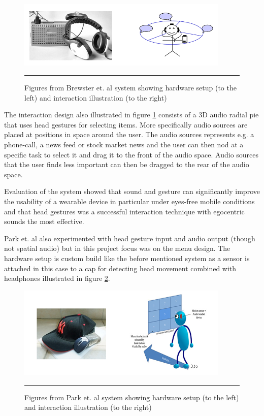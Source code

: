\begin{figure}[t]
	\centering
		\includegraphics[width=0.9\textwidth,height=\textheight,keepaspectratio]{./Figures/brewster-system.png}
		\rule{35em}{0.5pt}
	\caption[Brewster system]{Figures from Brewster et. al \cite{brewster_multimodaleyes-freeinteraction_2003} system showing hardware setup (to the left) and interaction illustration (to the right)}
	\label{fig:brewster}
\end{figure}

The interaction design also illustrated in figure \ref{fig:brewster} consists of a 3D audio radial pie that uses head gestures for selecting items. More specifically audio sources are placed at positions in space around the user. The audio sources represents e.g. a phone-call, a news feed or stock market news and the user can then nod at a specific task to select it and drag it to the front of the audio space. Audio sources that the user finds less important can then be dragged to the rear of the audio space.

Evaluation of the system showed that sound and gesture can significantly improve the usability of a wearable device in particular under eyes-free mobile conditions and that head gestures was a successful interaction technique with egocentric sounds the most effective.


Park et. al \cite{park_gaze-directed_2011} also experimented with head gesture input and audio output (though not spatial audio) but in this project focus was on the menu design. The hardware setup is custom build like the before mentioned system as a sensor is attached in this case to a cap for detecting head movement combined with headphones illustrated in figure \ref{fig:park}.

\begin{figure}[t]
	\centering
		\includegraphics[width=0.9\textwidth,height=\textheight,keepaspectratio]{./Figures/park-system.png}
		\rule{35em}{0.5pt}
	\caption[Park system]{Figures from Park et. al \cite{park_gaze-directed_2011} system showing hardware setup (to the left) and interaction illustration (to the right)}
	\label{fig:park}
\end{figure}

